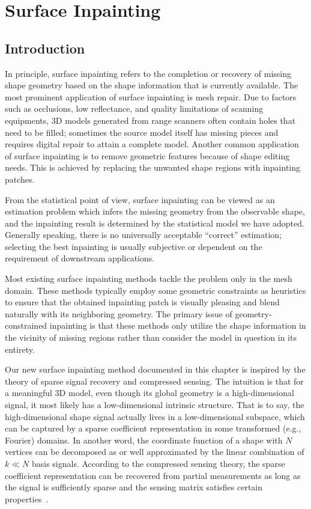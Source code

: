 \chapter{Surface Inpainting}
\section{Introduction}
\label{sec:inpainting:intro}

In principle, surface inpainting refers to the completion or
recovery of missing shape geometry based on the shape information that
is currently available. The most prominent application of surface
inpainting is mesh repair. Due to factors such as occlusions, low
reflectance, and quality limitations of scanning equipments, 3D models
generated from range scanners often contain holes that need to be
filled; sometimes the source model itself has missing pieces and requires
digital repair to attain a complete model. Another common application of
surface inpainting is to remove geometric features because of shape editing needs.
This is achieved by replacing the unwanted shape regions with inpainting
patches.

From the statistical point of view, surface inpainting can be viewed
as an estimation problem which infers the missing geometry from the
observable shape, and the inpainting result is determined by the
statistical model we have adopted. Generally speaking, there is no
universally acceptable ``correct'' estimation; selecting the best
inpainting is usually subjective or dependent on the requirement of
downstream applications.

Most existing surface inpainting methods tackle the problem only in
the mesh domain. These methods typically employ some geometric
constraints as heuristics to ensure that the obtained inpainting patch
is visually pleasing and blend naturally with its neighboring
geometry. The primary issue of geometry-constrained inpainting is that
these methods only utilize the shape information in the vicinity of
missing regions rather than consider the model in question in its
entirety.

Our new surface inpainting method documented in this chapter is inspired
by the theory of sparse signal recovery and compressed sensing. The
intuition is that for a meaningful 3D model, even though its global
geometry is a high-dimensional signal, it most likely has a
low-dimensional intrinsic structure. That is to say, the
high-dimensional shape signal actually lives in a low-dimensional
subspace, which can be captured by a sparse coefficient representation
in some transformed (e.g., Fourier) domains. In another word, the
coordinate function of a shape with $N$ vertices can be decomposed as or
well approximated by the linear combination of $k\ll N$ basis signals.
According to the compressed sensing theory, the sparse coefficient
representation can be recovered from partial measurements as long as
the signal is sufficiently sparse and the sensing matrix satisfies
certain properties~\cite{Candes2006}.

